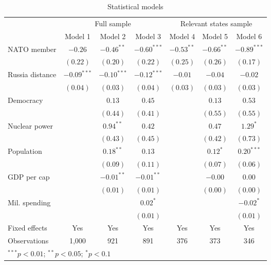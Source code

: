 
\begin{table}[h]
\begin{center}
\begin{tabular}{l c c c c c c}
\hline
 & \multicolumn{3}{c}{Full sample} & \multicolumn{3}{c}{Relevant states sample} \\
\cline{2-4} \cline{5-7}
 & Model 1 & Model 2 & Model 3 & Model 4 & Model 5 & Model 6 \\
\hline
NATO member     & $-0.26$       & $-0.46^{**}$  & $-0.60^{***}$ & $-0.53^{**}$ & $-0.66^{**}$ & $-0.89^{***}$ \\
                & $(0.22)$      & $(0.20)$      & $(0.22)$      & $(0.25)$     & $(0.26)$     & $(0.17)$      \\
Russia distance & $-0.09^{***}$ & $-0.10^{***}$ & $-0.12^{***}$ & $-0.01$      & $-0.04$      & $-0.02$       \\
                & $(0.04)$      & $(0.03)$      & $(0.04)$      & $(0.03)$     & $(0.03)$     & $(0.03)$      \\
Democracy       &               & $0.13$        & $0.45$        &              & $0.13$       & $0.53$        \\
                &               & $(0.44)$      & $(0.41)$      &              & $(0.55)$     & $(0.55)$      \\
Nuclear power   &               & $0.94^{**}$   & $0.42$        &              & $0.47$       & $1.29^{*}$    \\
                &               & $(0.43)$      & $(0.45)$      &              & $(0.42)$     & $(0.73)$      \\
Population      &               & $0.18^{**}$   & $0.13$        &              & $0.12^{*}$   & $0.20^{***}$  \\
                &               & $(0.09)$      & $(0.11)$      &              & $(0.07)$     & $(0.06)$      \\
GDP per cap     &               & $-0.01^{**}$  & $-0.01^{**}$  &              & $-0.00$      & $0.00$        \\
                &               & $(0.01)$      & $(0.01)$      &              & $(0.00)$     & $(0.00)$      \\
Mil. spending   &               &               & $0.02^{*}$    &              &              & $-0.02^{*}$   \\
                &               &               & $(0.01)$      &              &              & $(0.01)$      \\
\hline
Fixed effects   & Yes           & Yes           & Yes           & Yes          & Yes          & Yes           \\
Observations    & 1,000         & 921           & 891           & 376          & 373          & 346           \\
\hline
\multicolumn{7}{l}{\scriptsize{$^{***}p<0.01$; $^{**}p<0.05$; $^{*}p<0.1$}}
\end{tabular}
\caption{Statistical models}
\label{table:coefficients}
\end{center}
\end{table}
